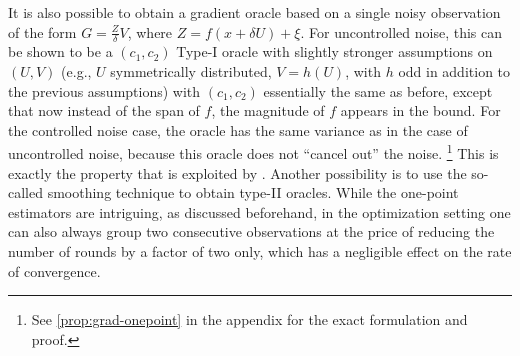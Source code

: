 It is also possible to obtain a gradient oracle based on a single noisy observation
of the form $G = \frac{Z}{\delta}V$, where $Z = f(x+\delta U) + \xi$. 
For uncontrolled noise, this can be shown to be a $(c_1,c_2)$ Type-I oracle with slightly stronger assumptions on $(U,V)$ (e.g., $U$ symmetrically distributed, $V = h(U)$, with $h$ odd in addition to the previous assumptions)
with $(c_1,c_2)$ essentially the same as before, except that now instead of the span of $f$, the magnitude of $f$ appears in the bound. For the controlled noise case, the oracle has the same variance as in the case of uncontrolled noise, because this oracle does not ``cancel out'' the noise.%
\footnote{See \cref{prop:grad-onepoint} in the appendix for the exact formulation and proof.} 
This is exactly the property that is exploited by \cite{duchi2015optimal}.
Another possibility is to use the so-called smoothing technique  to obtain type-II oracles. 
While the one-point estimators are intriguing, as discussed beforehand, 
in the optimization setting one can also always group two consecutive observations
at the price of reducing the number of rounds by a factor of two only, which has a negligible effect on the rate of convergence.

